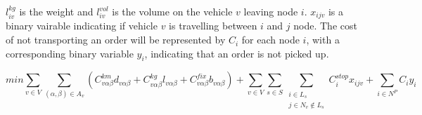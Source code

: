 \documentclass[a4paper,10pt]{article}
\begin{document}
$l_{iv}^{kg}$ is the weight and $l_{iv}^{vol}$ is the volume on the vehicle $v$ leaving node $i$. $x_{ijv}$ is a binary vairable indicating if vehicle $v$ is travelling between $i$ and $j$ node. 
The cost of not transporting an order will be represented by $C_i$ for each node $i$, with a corresponding binary variable $y_i$, indicating that an order is not picked up.

\begin{equation}
\label{eq:1}
        min\sum_{v\in V} \sum_{(\alpha, \beta) \in A_v} ( C^{km}_{v\alpha\beta}d_{v\alpha\beta} + C^{kg}_{v\alpha\beta}l_{v\alpha\beta} + C^{fix}_{v\alpha\beta}b_{v\alpha\beta} ) + \sum_{v\in V}\sum_{s\in S}\sum_{\substack{i \in L_s\\j \in N_v{\notin} L_s}}C^{stop}_ix_{ijv} + \sum_{i\in N^P}C_iy_i
\end{equation}
\end{document}
